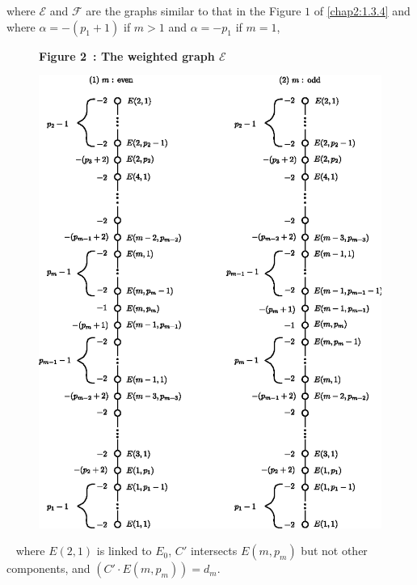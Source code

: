 \noindent
where $\mathscr{E}$ and $\mathscr{F}$ are the graphs similar to that
in the Figure $1$ of \ref{chap2:1.3.4} and where $\alpha=-(p_{1}+1)$ if
$m>1$ and $\alpha=-p_{1}$ if $m=1$,
\begin{figure}[H]
\centerline{{\bf Figure 2~: The weighted graph {\boldmath$\mathscr{E}$}}}

\bigskip
\centering
\includegraphics[scale=.9]{figures/chap2-fig29.eps}
\end{figure}\pageoriginale\
\noindent
where $E(2,1)$ is linked to $E_{0}$, $C'$ intersects $E(m,p_{m})$ but
not other components, and $(C'\cdot E(m,p_{m}))=d_{m}$.
